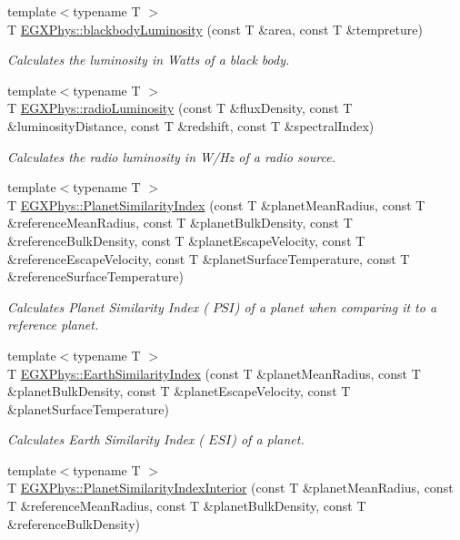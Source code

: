 \begin{DoxyCompactItemize}
{\footnotesize template$<$typename T $>$ }\\T \hyperlink{group___astrophysics_ga909f82edfaed449b44e94788b642ebb8}{E\+G\+X\+Phys\+::blackbody\+Luminosity} (const T \&area, const T \&tempreture)
\begin{DoxyCompactList}\small\item\em Calculates the luminosity in Watts of a black body. \end{DoxyCompactList}\item 
{\footnotesize template$<$typename T $>$ }\\T \hyperlink{group___astrophysics_ga6d6865b2aac1bc7c7f06b7c4ac2444e4}{E\+G\+X\+Phys\+::radio\+Luminosity} (const T \&flux\+Density, const T \&luminosity\+Distance, const T \&redshift, const T \&spectral\+Index)
\begin{DoxyCompactList}\small\item\em Calculates the radio luminosity in W/\+Hz of a radio source. \end{DoxyCompactList}\item 
{\footnotesize template$<$typename T $>$ }\\T \hyperlink{group___astrophysics_ga62e8b781c301df60bd04af3183a965eb}{E\+G\+X\+Phys\+::\+Planet\+Similarity\+Index} (const T \&planet\+Mean\+Radius, const T \&reference\+Mean\+Radius, const T \&planet\+Bulk\+Density, const T \&reference\+Bulk\+Density, const T \&planet\+Escape\+Velocity, const T \&reference\+Escape\+Velocity, const T \&planet\+Surface\+Temperature, const T \&reference\+Surface\+Temperature)
\begin{DoxyCompactList}\small\item\em Calculates Planet Similarity Index ( $PSI$) of a planet when comparing it to a reference planet. \end{DoxyCompactList}\item 
{\footnotesize template$<$typename T $>$ }\\T \hyperlink{group___astrophysics_ga4b86397b1c839c49ac599d49fda207d4}{E\+G\+X\+Phys\+::\+Earth\+Similarity\+Index} (const T \&planet\+Mean\+Radius, const T \&planet\+Bulk\+Density, const T \&planet\+Escape\+Velocity, const T \&planet\+Surface\+Temperature)
\begin{DoxyCompactList}\small\item\em Calculates Earth Similarity Index ( $ESI$) of a planet. \end{DoxyCompactList}\item 
{\footnotesize template$<$typename T $>$ }\\T \hyperlink{group___astrophysics_ga6dc06a1a8baf6e132abed51fcf410c7f}{E\+G\+X\+Phys\+::\+Planet\+Similarity\+Index\+Interior} (const T \&planet\+Mean\+Radius, const T \&reference\+Mean\+Radius, const T \&planet\+Bulk\+Density, const T \&reference\+Bulk\+Density)

\end{DoxyCompactItemize}
